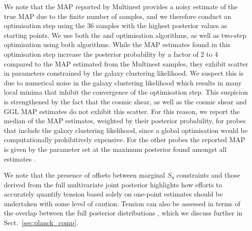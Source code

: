 We note that the MAP reported by {\sc Multinest} provides a noisy estimate of the true MAP due to the finite number of samples, and we therefore conduct an optimisation step using the 36 samples with the highest posterior values as starting points.
We use both the \citet{nelder/mead:1965} and \citet{Powell1964} optimisation algorithms, as well as two-step optimisation using both algorithms.  
While the MAP estimates found in this optimisation step increase the posterior probability by a factor of 2 to 4 compared to the MAP estimated from the {\sc Multinest} samples, they exhibit scatter in parameters constrained by the galaxy clustering likelihood. 
We suspect this is due to numerical noise in the galaxy clustering likelihood which results in many local minima that inhibit the convergence of the optimisation step. 
This suspicion is strengthened by the fact that the cosmic shear, as well as the cosmic shear and GGL MAP estimates do not exhibit this scatter. 
For this reason, we report the median of the MAP estimates, weighted by their posterior probability, for probes that include the galaxy clustering likelihood, since a global optimisation would be computationally prohibitively expensive. 
For the other probes the reported MAP is given by the parameter set at the maximum posterior found amongst all estimates \citep[see also][who adopt a similar approach]{muir/etal:2020}. 

We note that the presence of offsets between marginal $S_8$ constraints and those derived from the full multivariate joint posterior 
highlights how efforts to accurately quantify tension based solely on one-point estimates should be undertaken with some level of caution.  
Tension can also be assessed in terms of the overlap between the full posterior distributions \citep[see for example][]{handley/lemos:2019,lemos/etal:2019,Raveri2019}, which we discuss further in Sect.~\ref{sec:planck_comp}.








